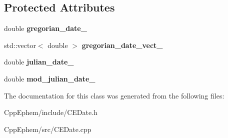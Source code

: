 \subsection*{Protected Attributes}
\begin{DoxyCompactItemize}
\item 
\hypertarget{class_c_e_date_aecd5239b5cf81e46525ee24c6bf2b48e}{}double {\bfseries gregorian\+\_\+date\+\_\+}\label{class_c_e_date_aecd5239b5cf81e46525ee24c6bf2b48e}

\item 
\hypertarget{class_c_e_date_a3f2468a5ab3c5e58a5da6b2800d88165}{}std\+::vector$<$ double $>$ {\bfseries gregorian\+\_\+date\+\_\+vect\+\_\+}\label{class_c_e_date_a3f2468a5ab3c5e58a5da6b2800d88165}

\item 
\hypertarget{class_c_e_date_a58170c23976d025cd631d42b10b8930c}{}double {\bfseries julian\+\_\+date\+\_\+}\label{class_c_e_date_a58170c23976d025cd631d42b10b8930c}

\item 
\hypertarget{class_c_e_date_aa713ba7b4c88ce0d453d18fb756cc645}{}double {\bfseries mod\+\_\+julian\+\_\+date\+\_\+}\label{class_c_e_date_aa713ba7b4c88ce0d453d18fb756cc645}

\end{DoxyCompactItemize}


The documentation for this class was generated from the following files\+:\begin{DoxyCompactItemize}
\item 
Cpp\+Ephem/include/C\+E\+Date.\+h\item 
Cpp\+Ephem/src/C\+E\+Date.\+cpp\end{DoxyCompactItemize}
